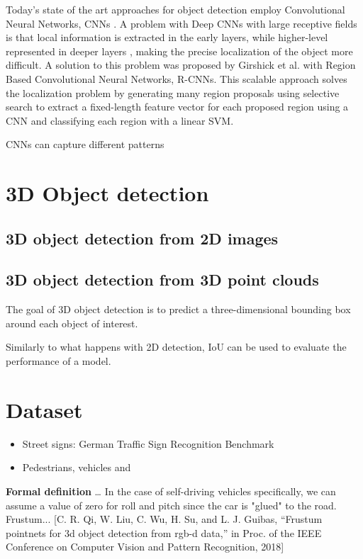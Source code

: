 Today's state of the art approaches for object detection employ Convolutional Neural Networks, CNNs \cite{DBLP:conf/eccv/CaiFFV16} \cite{DBLP:journals/pami/ChenKZMFU18}.
A problem with Deep CNNs with large receptive fields is that local information is extracted in the early layers, while higher-level represented in deeper layers \cite{DBLP:journals/ftcgv/JanaiGBG20}, making the precise localization of the object more difficult.
A solution to this problem was proposed by Girshick et al. \cite{DBLP:conf/cvpr/GirshickDDM14} with Region Based Convolutional Neural Networks, R-CNNs. This scalable approach solves the localization problem by generating many region proposals using selective search \cite{DBLP:journals/ijcv/UijlingsSGS13} to extract a fixed-length feature vector for each proposed region using a CNN and classifying each region with a linear SVM.




CNNs can capture different patterns 


\newpage
\section{3D Object detection}

\subsection{3D object detection from 2D images}

\subsection{3D object detection from 3D point clouds}
The goal of 3D object detection is to predict a three-dimensional bounding box around each object of interest.

Similarly to what happens with 2D detection, IoU can be used to evaluate the performance of a model.


\section*{Dataset}
\begin{itemize}
    \item Street signs: German Traffic Sign Recognition Benchmark
    \item Pedestrians, vehicles and 
\end{itemize}



\textbf{Formal definition}
\dots
In the case of self-driving vehicles specifically, we can assume a value of zero for roll and pitch since the car is "glued" to the road.
Frustum... [C. R. Qi, W. Liu, C. Wu, H. Su, and L. J. Guibas, “Frustum pointnets
for 3d object detection from rgb-d data,” in Proc. of the IEEE
Conference on Computer Vision and Pattern Recognition, 2018]




